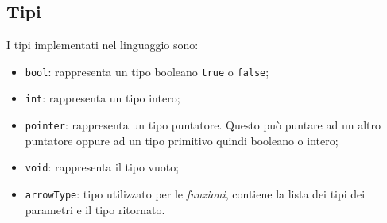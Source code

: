 \documentclass[../../main]{subfiles}
\begin{document}
\subsection{Tipi}
I tipi implementati nel linguaggio sono:
\begin{itemize}
    \item \verb|bool|: rappresenta un tipo booleano \verb|true| o \verb|false|;
    \item \verb|int|: rappresenta un tipo intero;
    \item \verb|pointer|: rappresenta un tipo puntatore. Questo può puntare ad un altro puntatore oppure ad un tipo primitivo quindi booleano o intero;
    \item \verb|void|: rappresenta il tipo vuoto;
    \item \verb|arrowType|: tipo utilizzato per le \textit{funzioni}, contiene la lista dei tipi dei parametri e il tipo ritornato.
\end{itemize}
\end{document}
